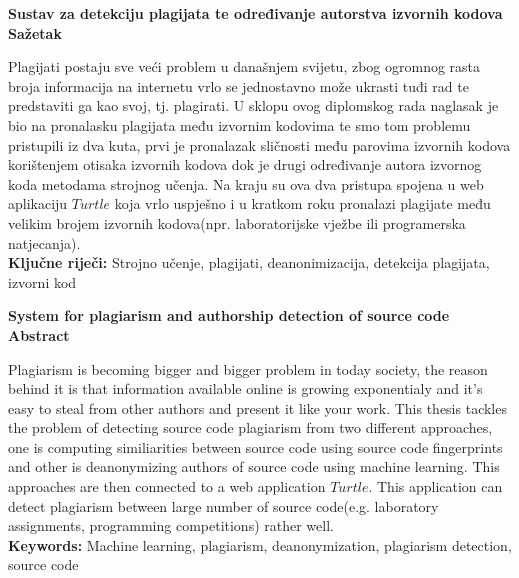 \begin{center}
\textbf{Sustav za detekciju plagijata te određivanje autorstva izvornih kodova} \\
\textbf{Sažetak}
\end{center}

	Plagijati postaju sve veći problem u današnjem svijetu, zbog ogromnog rasta broja informacija na internetu vrlo se jednostavno može ukrasti tuđi rad te predstaviti ga kao svoj, tj. plagirati. U sklopu ovog diplomskog rada naglasak je bio na pronalasku plagijata među izvornim kodovima te smo tom problemu pristupili iz dva kuta, prvi je pronalazak sličnosti među parovima izvornih kodova korištenjem otisaka izvornih kodova dok je drugi određivanje autora izvornog koda metodama strojnog učenja. Na kraju su ova dva pristupa spojena u web aplikaciju $Turtle$ koja vrlo uspješno i u kratkom roku pronalazi plagijate među velikim brojem izvornih kodova(npr. laboratorijske vježbe ili programerska natjecanja). \\
	
\noindent \textbf{Ključne riječi:} Strojno učenje, plagijati, deanonimizacija, detekcija plagijata, izvorni kod

\begin{center}
\textbf{System for plagiarism and authorship detection of source code} \\
\textbf{Abstract}
\end{center}

	Plagiarism is becoming bigger and bigger problem in today society, the reason behind it is that information available online is growing exponentialy and it's easy to steal from other authors and present it like your work. This thesis tackles the problem of detecting source code plagiarism from two different approaches, one is computing similiarities between source code using source code fingerprints and other is deanonymizing authors of source code using machine learning. This approaches are then connected to a web application $Turtle$. This application can detect plagiarism between large number of source code(e.g. laboratory assignments, programming competitions) rather well. \\
	
\noindent \textbf{Keywords:} Machine learning, plagiarism, deanonymization, plagiarism detection, source code